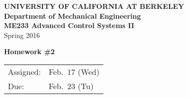 \documentclass[letterpaper,12pt]{article}
\begin{document}
\begin{center}
    {\bf UNIVERSITY OF CALIFORNIA AT BERKELEY}\\
    {\bf Department of Mechanical Engineering}\\
    {\bf ME233  Advanced Control Systems II}\\
    Spring 2016\\
\end{center}
\noindent
{\Large \bf Homework \#2 }\\[-3em]
\begin{flushright}
\begin{tabular} {l l}
    Assigned: &  Feb.\ 17 (Wed)\\
    Due: & Feb.\ 23 (Tu)
\end{tabular}
\end{flushright}
\end{document}
